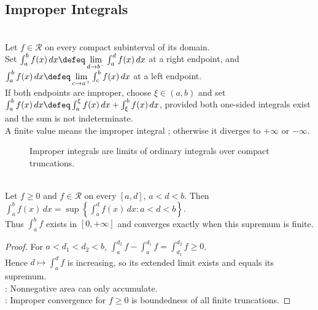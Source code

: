 \subsection{Improper Integrals}

\begin{definition} \label{def:improper-riemann-integral} \\
Let $f\in\mathcal{R}$ on every compact subinterval of its domain.\\
Set $\int_a^b f(x)\,dx\defeq\lim\limits_{d\to b^-}\int_a^d f(x)\,dx$ at a right endpoint, and $\int_a^b f(x)\,dx\defeq\lim\limits_{c\to a^+}\int_c^b f(x)\,dx$ at a left endpoint.\\
If both endpoints are improper, choose $\xi\in(a,b)$ and set $\int_a^b f(x)\,dx \defeq \int_a^\xi f(x)\,dx+\int_\xi^b f(x)\,dx$, provided both one-sided integrals exist and the sum is not indeterminate.\\
A finite value means the improper integral ; otherwise it diverges to $+\infty$ or $-\infty$.
\end{definition}

\begin{figure}[H]
  \centering
  
  \caption{Improper integrals are limits of ordinary integrals over compact truncations.}
  \label{fig:improper-integral-truncations}
\end{figure}

\begin{theorem} \label{thm:nonnegative-improper-integral-supremum} \\
Let $f\geq0$ and $f\in\mathcal{R}$ on every $[a,d]$, $a<d<b$. Then $\int_a^b f(x)\,dx=\sup\left\{\int_a^d f(x)\,dx:a<d<b\right\}$.\\
Thus $\int_a^b f$ exists in $[0,+\infty]$ and converges exactly when this supremum is finite.
\begin{proof}
For $a<d_1<d_2<b$, $\int_a^{d_2}f-\int_a^{d_1}f=\int_{d_1}^{d_2}f\geq0$.\\
Hence $d\mapsto\int_a^d f$ is increasing, so its extended limit exists and equals its supremum.\\
: Nonnegative area can only accumulate.\\
: Improper convergence for $f\geq0$ is boundedness of all finite truncations.
\end{proof}
\end{theorem}

